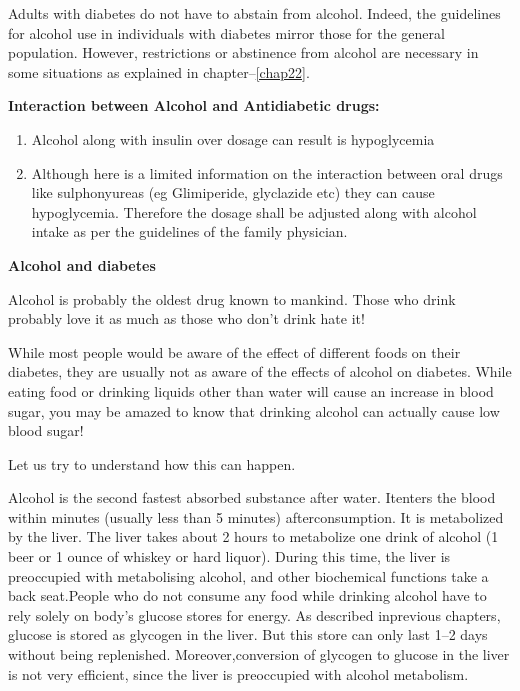 Adults with diabetes do not have to abstain from alcohol. Indeed, the guidelines for alcohol use in individuals with diabetes mirror those for the general population. However, restrictions or abstinence from alcohol are necessary in some situations as explained in chapter–\ref{chap22}.

\noindent\textbf{Interaction between Alcohol and Antidiabetic drugs:}

\begin{enumerate}[•]
\itemsep=0pt
\item Alcohol along with insulin over dosage can result is hypoglycemia
\item Although here is a limited information on the interaction between oral drugs like sulphonyureas (eg Glimiperide, glyclazide etc) they can cause hypoglycemia. Therefore the dosage shall be adjusted along with alcohol intake as per the guidelines of the family physician.
\end{enumerate}

\noindent\textbf{Alcohol and diabetes}

Alcohol is probably the oldest drug known to mankind. Those who drink probably love it as much as those who don’t drink hate it!

While most people would be aware of the effect of different foods on their diabetes, they are usually not as aware of the effects of alcohol on diabetes. While eating food or drinking liquids other than water will cause an increase in blood sugar, you may be amazed to know that drinking alcohol can actually cause low blood sugar!

Let us try to understand how this can happen.

Alcohol is the second fastest absorbed substance after water. It\break enters the blood within minutes (usually less than 5 minutes) after\break consumption. It is metabolized by the liver. The liver takes about 2 hours to metabolize one drink of alcohol (1 beer or 1 ounce of whiskey or hard liquor). During this time, the liver is preoccupied with metabo\-lising alcohol, and other biochemical functions take a back seat.\break People who do not consume any food while drinking alcohol have to rely solely on body’s glucose stores for energy. As described in\break previous chapters, glucose is stored as glycogen in the liver. But this store can only last 1–2 days without being replenished. Moreover,\break conversion of glycogen to glucose in the liver is not very efficient, since the liver is preoccupied with alcohol metabolism.

